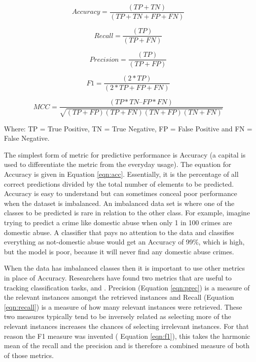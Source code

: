 \begin{equation}
Accuracy =  \frac{(TP+TN)}{(TP + TN + FP + FN)}
\label{eqn:acc}
\end{equation}

\begin{equation}
Recall =  \frac{(TP)}{(TP + FN)}
\label{eqn:recall}
\end{equation}

\begin{equation}
Precision=  \frac{(TP)}{(TP + FP)}
\label{eqn:prec}
\end{equation}

\begin{equation}
F1 =  \frac{(2 * TP)}{(2*TP + FP + FN)}
\label{eqn:f1}
\end{equation}

\begin{equation}
MCC =  \frac{(TP*TN – FP*FN)}{\sqrt{(TP+FP)(TP+FN)(TN+FP)(TN+FN)}}
\label{eqn:mcc}
\end{equation}

Where: TP = True Positive, TN = True Negative, FP = False Positive and FN = False Negative.

The simplest form of metric for predictive performance is Accuracy (a capital  is used to differentiate the metric from the everyday usage). The equation for Accuracy is given in Equation \ref{eqn:acc}. Essentially, it is the percentage of all correct predictions divided by the total number of elements to be predicted. Accuracy is easy to understand but can sometimes conceal poor performance when the dataset is imbalanced. An imbalanced data set is where one of the classes to be predicted is rare in relation to the other class. For example, imagine trying to predict a crime like domestic abuse when only 1 in 100 crimes are domestic abuse. A classifier that pays no attention to the data and classifies everything as not-domestic abuse would get an Accuracy of 99\%, which is high, but the model is poor, because it will never find any domestic abuse crimes.

When the data has imbalanced classes then it is important to use other metrics in place of Accuracy. Researchers have found two metrics that are useful to tracking classification tasks,  and  \parencite[Chapter~5]{witten_frank_hall_pal_2017}. Precision (Equation \ref{eqn:prec}) is a measure of the relevant instances amongst the retrieved instances and Recall (Equation \ref{eqn:recall}) is a measure of how many relevant instances were retrieved. These two measures typically tend to be inversely related as selecting more of the relevant instances increases the chances of selecting irrelevant instances. For that reason the F1 measure was invented ( Equation \ref{eqn:f1}), this takes the harmonic mean of the recall and the precision and is therefore a combined measure of both of those metrics. 

